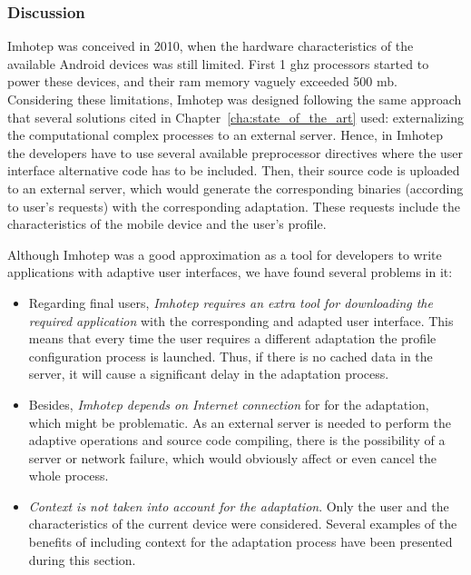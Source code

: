 \subsubsection{Discussion}
\label{sec:imhotep_discussion}

Imhotep was conceived in 2010, when the hardware characteristics of the available 
Android devices was still limited. First 1 \ac{ghz} processors started to power 
these devices, and their \ac{ram} memory vaguely exceeded 500 \ac{mb}. Considering 
these limitations, Imhotep was designed following the same approach that several 
solutions cited in Chapter~\ref{cha:state_of_the_art} used: externalizing the 
computational complex processes to an external server. Hence, in Imhotep the 
developers have to use several available preprocessor directives where the user 
interface alternative code has to be included. Then, their source code is 
uploaded to an external server, which would generate the corresponding binaries 
(according to user's requests) with the corresponding adaptation. These requests 
include the characteristics of the mobile device and the user's profile. 

Although Imhotep was a good approximation as a tool for developers to write 
applications with adaptive user interfaces, we have found several problems
in it:

\begin{itemize}
  \item Regarding final users, \textit{Imhotep requires an extra tool for 
  downloading the required application} with the corresponding and adapted user 
  interface. This means that every time the user requires a different adaptation 
  the profile configuration process is launched. Thus, if there is no cached data 
  in the server, it will cause a significant delay in the adaptation process.
  
  \item Besides, \textit{Imhotep depends on Internet connection} for for the 
  adaptation, which might be problematic. As an external server is needed to 
  perform the adaptive operations and source code compiling, there is the 
  possibility of a server or network failure, which would obviously affect or 
  even cancel the whole process.
  
  \item \textit{Context is not taken into account for the adaptation}. Only the 
  user and the characteristics of the current device were considered. Several 
  examples of the benefits of including context for the adaptation process have
  been presented during this section.
\end{itemize}

